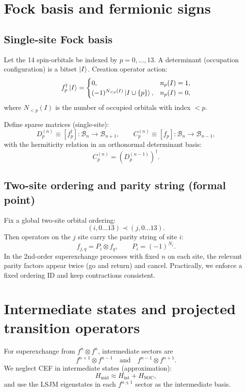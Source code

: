 \documentclass[11pt]{article}
\begin{document}
\section{Fock basis and fermionic signs}
\subsection{Single-site Fock basis}
Let the 14 spin-orbitals be indexed by $p=0,\dots,13$. A determinant (occupation configuration) is a bitset $\ket{I}$.
Creation operator action:
\begin{equation}
f^\dagger_p \ket{I}=
\begin{cases}
0,& n_p(I)=1,\\
(-1)^{N_{<p}(I)} \ket{I\cup\{p\}},& n_p(I)=0,
\end{cases}
\end{equation}
where $N_{<p}(I)$ is the number of occupied orbitals with index $<p$.

Define sparse matrices (single-site):
\begin{equation}
D^{(n)}_p \equiv [f^\dagger_p]: \mathcal{B}_n \to \mathcal{B}_{n+1},
\qquad
C^{(n)}_p \equiv [f_p]: \mathcal{B}_n \to \mathcal{B}_{n-1},
\end{equation}
with the hermiticity relation in an orthonormal determinant basis:
\begin{equation}
C^{(n)}_p = \left(D^{(n-1)}_p\right)^\dagger.
\end{equation}

\subsection{Two-site ordering and parity string (formal point)}
Fix a global two-site orbital ordering:
\[
(i,0\ldots13)\prec(j,0\ldots13).
\]
Then operators on the $j$ site carry the parity string of site $i$:
\begin{equation}
f_{j,q} = P_i \otimes f_q,\qquad P_i=(-1)^{N_i}.
\end{equation}
In the 2nd-order superexchange processes with fixed $n$ on each site, the relevant parity factors appear twice (go and return) and cancel. Practically, we enforce a fixed ordering ID and keep contractions consistent.

\section{Intermediate states and projected transition operators}
For superexchange from $f^n\otimes f^n$, intermediate sectors are
\[
f^{n+1}\otimes f^{n-1}\quad \text{and}\quad f^{n-1}\otimes f^{n+1}.
\]
We neglect CEF in intermediate states (approximation):
\[
H_{\text{mid}} \approx H_{\text{int}} + H_{\text{SOC}},
\]
and use the LSJM eigenstates in each $f^{n\pm1}$ sector as the intermediate basis.
\end{document}
